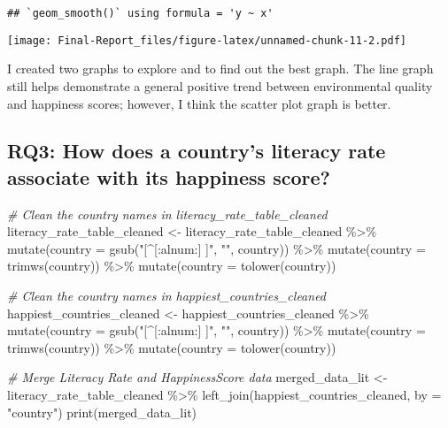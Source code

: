 \documentclass[
]{article}
\newenvironment{Shaded}{\begin{snugshade}}{\end{snugshade}}
\newcommand{\AttributeTok}[1]{\textcolor[rgb]{0.77,0.63,0.00}{#1}}
\newcommand{\CommentTok}[1]{\textcolor[rgb]{0.56,0.35,0.01}{\textit{#1}}}
\newcommand{\FunctionTok}[1]{\textcolor[rgb]{0.00,0.00,0.00}{#1}}
\newcommand{\NormalTok}[1]{#1}
\newcommand{\OtherTok}[1]{\textcolor[rgb]{0.56,0.35,0.01}{#1}}
\newcommand{\SpecialCharTok}[1]{\textcolor[rgb]{0.00,0.00,0.00}{#1}}
\newcommand{\StringTok}[1]{\textcolor[rgb]{0.31,0.60,0.02}{#1}}
\begin{document}
\begin{verbatim}
## `geom_smooth()` using formula = 'y ~ x'
\end{verbatim}

\texttt{[image: Final-Report\_files/figure-latex/unnamed-chunk-11-2.pdf]}

I created two graphs to explore and to find out the best graph. The line
graph still helps demonstrate a general positive trend between
environmental quality and happiness scores; however, I think the scatter
plot graph is better.

\hypertarget{rq3-how-does-a-countrys-literacy-rate-associate-with-its-happiness-score}{%
\subsection{RQ3: How does a country's literacy rate associate with its
happiness
score?}\label{rq3-how-does-a-countrys-literacy-rate-associate-with-its-happiness-score}}

\begin{Shaded}
\begin{Highlighting}[]
\CommentTok{\# Clean the country names in literacy\_rate\_table\_cleaned}
\NormalTok{literacy\_rate\_table\_cleaned }\OtherTok{\textless{}{-}}\NormalTok{ literacy\_rate\_table\_cleaned }\SpecialCharTok{\%\textgreater{}\%}
  \FunctionTok{mutate}\NormalTok{(}\AttributeTok{country =} \FunctionTok{gsub}\NormalTok{(}\StringTok{"[\^{}[:alnum:] ]"}\NormalTok{, }\StringTok{""}\NormalTok{, country)) }\SpecialCharTok{\%\textgreater{}\%} 
  \FunctionTok{mutate}\NormalTok{(}\AttributeTok{country =} \FunctionTok{trimws}\NormalTok{(country)) }\SpecialCharTok{\%\textgreater{}\%}                    
  \FunctionTok{mutate}\NormalTok{(}\AttributeTok{country =} \FunctionTok{tolower}\NormalTok{(country))                    }

\CommentTok{\# Clean the country names in happiest\_countries\_cleaned}
\NormalTok{happiest\_countries\_cleaned }\OtherTok{\textless{}{-}}\NormalTok{ happiest\_countries\_cleaned }\SpecialCharTok{\%\textgreater{}\%}
  \FunctionTok{mutate}\NormalTok{(}\AttributeTok{country =} \FunctionTok{gsub}\NormalTok{(}\StringTok{"[\^{}[:alnum:] ]"}\NormalTok{, }\StringTok{""}\NormalTok{, country)) }\SpecialCharTok{\%\textgreater{}\%} 
  \FunctionTok{mutate}\NormalTok{(}\AttributeTok{country =} \FunctionTok{trimws}\NormalTok{(country)) }\SpecialCharTok{\%\textgreater{}\%}                   
  \FunctionTok{mutate}\NormalTok{(}\AttributeTok{country =} \FunctionTok{tolower}\NormalTok{(country))                    }

\CommentTok{\# Merge Literacy Rate and HappinessScore data}
\NormalTok{merged\_data\_lit }\OtherTok{\textless{}{-}}\NormalTok{ literacy\_rate\_table\_cleaned }\SpecialCharTok{\%\textgreater{}\%}
  \FunctionTok{left\_join}\NormalTok{(happiest\_countries\_cleaned, }\AttributeTok{by =} \StringTok{"country"}\NormalTok{)}
\FunctionTok{print}\NormalTok{(merged\_data\_lit)}
\end{Highlighting}
\end{Shaded}
\end{document}
